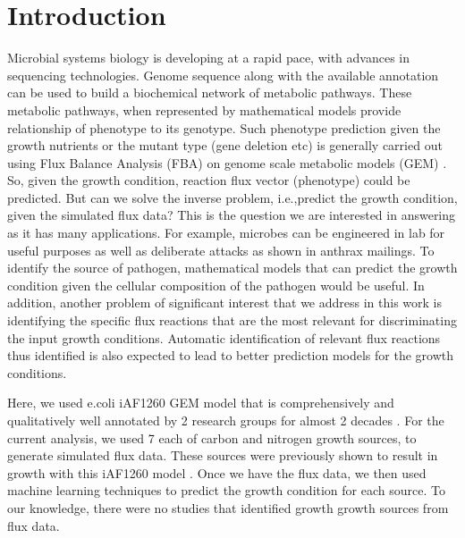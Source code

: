 \documentclass[12pt]{article}
\begin{document}
\section*{Introduction}
Microbial systems biology is developing at a rapid pace, with advances in sequencing technologies. Genome sequence along with the available annotation can be used to build a biochemical network of metabolic pathways. These metabolic pathways, when represented by mathematical models provide relationship of phenotype to its genotype. Such phenotype prediction given the growth nutrients or the mutant type (gene deletion etc) is generally carried out using Flux Balance Analysis (FBA) \cite{Orthetal2010} on genome scale metabolic  models (GEM) \cite{EdwardsPalsson2000, Karpetal1996, OuzounisKarp2000}. So, given the growth condition, reaction flux vector (phenotype) could be predicted. But can we solve the inverse problem, i.e.,predict the growth condition, given the simulated flux data? This is the question we are interested in answering as it has many applications. For example, microbes can be engineered in lab for useful purposes as well as deliberate attacks as shown in anthrax mailings. To identify the source of pathogen, mathematical models that can predict the growth condition given the cellular composition of the pathogen would be useful. In addition, another problem of significant interest that we address in this work is identifying the specific flux reactions that are the most relevant for discriminating the input growth conditions. Automatic identification of relevant flux reactions thus identified is also expected to lead to better prediction models for the growth conditions.

\bigskip
\noindent
Here, we used e.coli iAF1260 GEM model \cite{Feistetal2007} that is comprehensively and qualitatively well annotated by 2 research groups for almost 2 decades \cite{EdwardsPalsson2000,Reedetal2003,Feistetal2007,Orthetal2012}. For the current analysis, we used 7 each of carbon and nitrogen growth sources, to generate simulated flux data. These sources were previously shown to result in growth with this iAF1260 model \cite{Feistetal2007}. Once we have the flux data, we then used machine learning techniques to predict the growth condition for each source. To our knowledge, there were no studies that identified growth growth sources from flux data.
\end{document}
